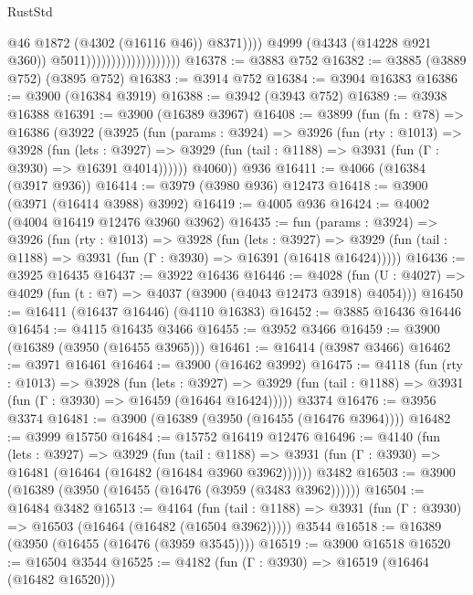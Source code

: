 \begin{lexlean}{RustStd}
\begin{coremodule}
                                                  @46
                                                  @1872
                                                  (@4302 (@16116 @46))
                                                  @8371))))
                                          @4999
                                          (@4343 (@14228 @921 @360))
                                          @5011)))))))))))))))))))
@16378 := @3883 @752
@16382 := @3885 (@3889 @752) (@3895 @752)
@16383 := @3914 @752
@16384 := @3904 @16383
@16386 := @3900 (@16384 @3919)
@16388 := @3942 (@3943 @752)
@16389 := @3938 @16388
@16391 := @3900 (@16389 @3967)
@16408 := @3899
    (fun (fn : @78) =>
    @16386
      (@3922
        (@3925
          (fun (params : @3924) =>
          @3926
            (fun (rty : @1013) =>
            @3928
              (fun (lets : @3927) =>
              @3929 (fun (tail : @1188) => @3931 (fun (Γ : @3930) => @16391 @4014))))))
        @4060))
    @936
@16411 := @4066 (@16384 (@3917 @936))
@16414 := @3979 (@3980 @936) @12473
@16418 := @3900 (@3971 (@16414 @3988) @3992)
@16419 := @4005 @936
@16424 := @4002 (@4004 @16419 @12476 @3960 @3962)
@16435 := fun (params : @3924) =>
  @3926
    (fun (rty : @1013) =>
    @3928
      (fun (lets : @3927) =>
      @3929 (fun (tail : @1188) => @3931 (fun (Γ : @3930) => @16391 (@16418 @16424)))))
@16436 := @3925 @16435
@16437 := @3922 @16436
@16446 := @4028
    (fun (U : @4027) => @4029 (fun (t : @7) => @4037 (@3900 (@4043 @12473 @3918) @4054)))
@16450 := @16411 (@16437 @16446) (@4110 @16383)
@16452 := @3885 @16436 @16446
@16454 := @4115 @16435 @3466
@16455 := @3952 @3466
@16459 := @3900 (@16389 (@3950 (@16455 @3965)))
@16461 := @16414 (@3987 @3466)
@16462 := @3971 @16461
@16464 := @3900 (@16462 @3992)
@16475 := @4118
    (fun (rty : @1013) =>
    @3928
      (fun (lets : @3927) =>
      @3929 (fun (tail : @1188) => @3931 (fun (Γ : @3930) => @16459 (@16464 @16424)))))
    @3374
@16476 := @3956 @3374
@16481 := @3900 (@16389 (@3950 (@16455 (@16476 @3964))))
@16482 := @3999 @15750
@16484 := @15752 @16419 @12476
@16496 := @4140
    (fun (lets : @3927) =>
    @3929
      (fun (tail : @1188) =>
      @3931 (fun (Γ : @3930) => @16481 (@16464 (@16482 (@16484 @3960 @3962))))))
    @3482
@16503 := @3900 (@16389 (@3950 (@16455 (@16476 (@3959 (@3483 @3962))))))
@16504 := @16484 @3482
@16513 := @4164
    (fun (tail : @1188) => @3931 (fun (Γ : @3930) => @16503 (@16464 (@16482 (@16504 @3962)))))
    @3544
@16518 := @16389 (@3950 (@16455 (@16476 (@3959 @3545))))
@16519 := @3900 @16518
@16520 := @16504 @3544
@16525 := @4182 (fun (Γ : @3930) => @16519 (@16464 (@16482 @16520)))

\end{coremodule}
\end{lexlean}
